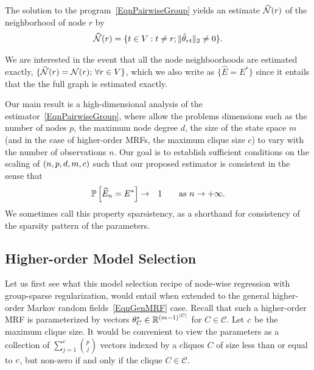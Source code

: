 The solution to the program~\eqref{EqnPairwiseGroup} yields an estimate $\widehat{\mathcal{N}}(r)$ of the neighborhood of node $r$ by 
\begin{align*}
	\widehat{\mathcal{N}}(r) = \{t \in V : t \neq r ; \| \hat{\theta}_{rt} \|_2 \neq 0\}. 
\end{align*}

We are interested in the event that all the node neighboorhoods are estimated exactly, $\{\widehat{\mathcal{N}}(r) = \mathcal{N}(r); \, \forall r \in V\}$,
which we also write as $\{\hat{E} = E^*\}$ since it entails that the the full graph is estimated exactly.

 Our main result is a high-dimensional analysis of the estimator~\eqref{EqnPairwiseGroup}, where allow the problems dimensions such as the number of nodes $p$,
the maximum node degree $d$, the size of the state space $m$ (and in the case of higher-order MRFs, the maximum clique size $c$) to vary with the number of observations $n$. Our goal is to establish sufficient conditions on the scaling of $(n, p, d, m, c)$ such that our proposed estimator is consistent in the sense that
\begin{eqnarray*}
\mathbb{P} \left[\widehat{E}_n = E^* \right] & \rightarrow &
1 \qquad \mbox{as $n \rightarrow +\infty$}.
\end{eqnarray*}
We sometimes call this property sparsistency, as a shorthand for consistency of the sparsity pattern of the parameters.

\subsection{Higher-order Model Selection}

 Let us first see what this model selection recipe of node-wise regression with group-sparse regularization, would entail when extended to the general higher-order Markov random fields~\eqref{EqnGenMRF} case.  Recall that such a higher-order MRF  is parameterized by vectors $\theta^*_{C} \in \mathbb{R}^{(m - 1)^{|C|}}$ for $C \in \mathcal{C}$. Let $c$ be the maximum clique size. It would be convenient to view the parameters as a collection of $\sum_{j=1}^{c} \binom{p}{j}$ vectors indexed by a cliques $C$ of size less than or equal to $c$, but non-zero if and only if the clique $C \in \mathcal{C}$. 

